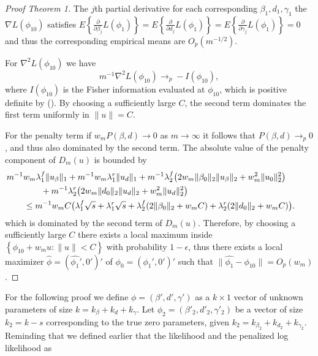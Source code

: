 \begin{proof}[Proof Theorem 1]
The $j${th} partial derivative for each corresponding $\beta_1,d_1,\gamma_1$  the $\nabla L(\phi_{10})$ satisfies
$E\left\lbrace \frac{\partial}{\partial \beta_j}L(\phi_1)\right\rbrace=E\left\lbrace \frac{\partial}{\partial d_j}L(\phi_1)\right\rbrace=E\left\lbrace \frac{\partial}{\partial \gamma_j}L(\phi_1)\right\rbrace=0$ and thus the corresponding empirical means  are $O_p(m^{-1/2})$.

For $\nabla^2 L(\phi_{10})$ we have $$m^{-1} \nabla^2 L(\phi_{10}) \rightarrow_p -I(\phi_{10}),$$ where $I(\phi_{10})$ is the Fisher information evaluated at $\phi_{10}$, which is  positive definite by  (). By choosing a sufficiently large $C$, the second term dominates the first term uniformly in $\|u\|=C$.

For the penalty term if $w_mP(\beta,d) \rightarrow 0$ as $m \rightarrow \infty$ it follows that $P(\beta,d) \rightarrow_p 0$, and thus also dominated by the second term.  The absolute value of the  penalty component of $D_m(u)$ is bounded by
\begin{align*}
&\hspace{-2em} m^{-1}w_m\lambda_1^f\|u_\beta\|_1 +m^{-1}w_m\lambda_1^r\|u_d\|_1
  +m^{-1}\lambda_2^f\bigl(2w_m\|\beta_0\|_2 \|u_\beta\|_2 +w_m^2\|u_0\|_2^2\bigr)
\\
&\hspace{2em} +m^{-1}\lambda_2^r\bigl(2w_m\|d_0\|_2 \|u_d\|_2+w_m^2\|u_d\|_2^2\bigr)
\\
&\le m^{-1}w_mC\bigl(\lambda_1^f\sqrt s  +\lambda_1^r\sqrt s   +\lambda_2^f(2\|\beta_0\|_2  + w_m C)  +\lambda_2^r(2\|d_0\|_2  + w_m C)\bigr).
\end{align*}
which is dominated by the second term of $D_m(u)$. Therefore, by choosing  a sufficiently large $C$ there exists a local maximum inside $\left\lbrace\phi_{10}+w_mu:\|u\|<C \right\rbrace$  with probability $1-\epsilon$, thus there exists a local maximizer $\hat{\phi}=(\hat{\phi_1}',0')'$ of $\phi_0=(\phi_1',0')'$ such that $\|\hat{\phi_1}-\phi_{10}\|=O_p(w_m)$.
\end{proof}
For the following proof we define $\phi=(\beta',d',\gamma')$ as a $k \times 1$ vector of unknown parameters of size $k=k_{\beta}+k_d+k_{\gamma}$. Let $\phi_2=(\beta'_2,d'_2,\gamma'_2)$ be a vector of size $k_2=k-s$ corresponding to the true zero parameters, given $k_2=k_{\beta_2}+k_{d_2}+k_{\gamma_2}$. Reminding that we defined earlier that the likelihood and the penalized log likelihood as
